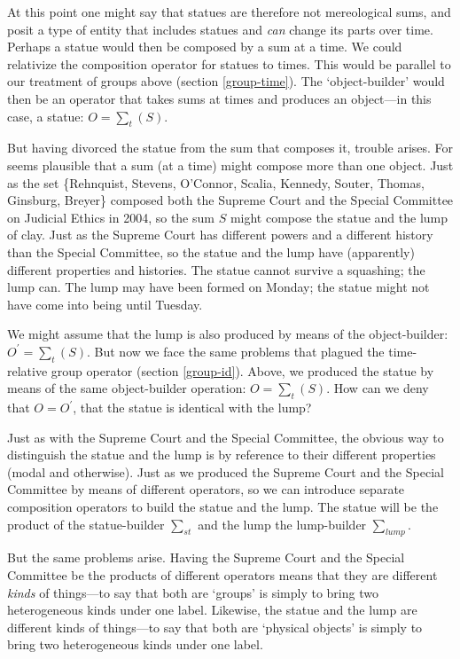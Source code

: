 \documentclass[11pt]{article}
\begin{document}
\begin{spacing}{1.5}
At this point one might say that statues are therefore not
mereological sums, and posit a type of entity that includes statues
and {\em can} change its parts over time.  Perhaps a statue would then
be composed by a sum at a time.  We could relativize the composition
operator for statues to times.  This would be parallel to our
treatment of groups above (section \ref{group-time}).  The
`object-builder' would then be an operator that takes sums at times
and produces an object---in this case, a statue: $O = \sum _{t} ( S
)$.

But having divorced the statue from the sum that composes it, trouble
arises.  For seems plausible that a sum (at a time) might compose more
than one object.  Just as the set \{Rehnquist, Stevens, O'Connor,
Scalia, Kennedy, Souter, Thomas, Ginsburg, Breyer\} composed both the
Supreme Court and the Special Committee on Judicial Ethics in 2004, so
the sum $S$ might compose the statue and the lump of clay.  Just as
the Supreme Court has different powers and a different history than
the Special Committee, so the statue and the lump have (apparently)
different properties and histories.  The statue cannot survive a
squashing; the lump can.  The lump may have been formed on Monday; the
statue might not have come into being until Tuesday.

We might assume that the lump is also produced by means of the
object-builder: $O^{\prime} = \sum _{t} ( S )$.  But now we face the
same problems that plagued the time-relative group operator (section
\ref{group-id}).  Above, we produced the statue by means of the same
object-builder operation: $O = \sum _{t} ( S )$.  How can we deny that
$O = O^{\prime}$, that the statue is identical with the lump?

Just as with the Supreme Court and the Special Committee, the obvious
way to distinguish the statue and the lump is by reference to their
different properties (modal and otherwise).  Just as we produced the
Supreme Court and the Special Committee by means of different
operators, so we can introduce separate composition operators to build
the statue and the lump.  The statue will be the product of the
statue-builder $\sum _{st}$ and the lump the lump-builder $\sum
_{lump}$.

But the same problems arise.  Having the Supreme Court and the Special
Committee be the products of different operators means that they are
different {\em kinds} of things---to say that both are `groups' is
simply to bring two heterogeneous kinds under one label.  Likewise, the
statue and the lump are different kinds of things---to say that both
are `physical objects' is simply to bring two heterogeneous kinds
under one label.


\end{spacing}
\end{document}
